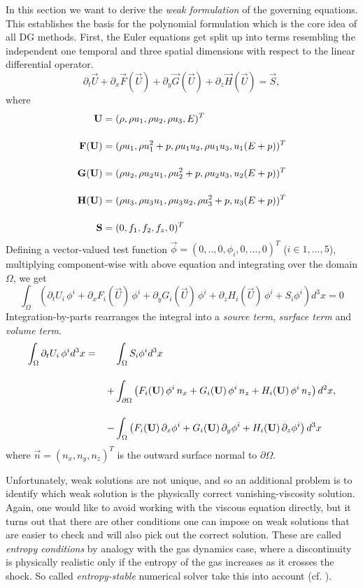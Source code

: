 In this section we want to derive the \emph{weak formulation} of the governing
equations. This establishes the basis for the polynomial formulation which is
the core idea of all DG methods.  First, the Euler equations get split up into
terms resembling the independent one temporal and three spatial
dimensions with respect to the linear differential operator.
\begin{equation}
\partial_t \vec{U} + \partial_x\vec{F}(\vec{U})+ \partial_y\vec{G}(\vec{U}) + \partial_z\vec{H}(\vec{U}) = \vec{S},
\end{equation}
where
\begin{align}
    \vec{U} &= (\dens, \dens\vels_1, \dens\vels_2, \dens\vels_3, \Ener)^T\br
    \vec{F}(\vec{U}) &= (\dens\vels_1, \dens\vels_1^2 + \pres, \dens\vels_1\vels_2, \dens\vels_1\vels_3, \vels_1(\Ener + \pres))^T\br
    \vec{G}(\vec{U}) &= (\dens\vels_2, \dens\vels_2\vels_1, \dens\vels_2^2 + \pres, \dens\vels_2\vels_3, \vels_2(\Ener + \pres))^T\br
    \vec{H}(\vec{U}) &= (\dens\vels_3, \dens\vels_3\vels_1, \dens\vels_3\vels_2, \dens\vels_3^2 + \pres, \vels_3(\Ener + \pres))^T\br
    \vec{S} &= (0,f_1,f_2,f_z,0)^T
\end{align}
Defining a vector-valued test function $\vec{\phi} = (0,..,0,\phi_i,0,...,0)^T$
($i\in{1,...,5}$), multiplying component-wise with above equation and
integrating over the domain $\Omega$, we get
\begin{equation}
    \int_\Omega \left( \partial_tU_i\,\phi^i 
        + \partial_x F_i(\vec{U})\,\phi^i 
        + \partial_y G_i(\vec{U})\,\phi^i 
        + \partial_z H_i(\vec{U})\,\phi^i + S_i \phi^i \right) d^3x = 0
\end{equation}
Integration-by-parts rearranges the integral into a \emph{source term},
\emph{surface term} and \emph{volume term}.
\begin{align}
\label{eqn:weak-formulation}
    \int_\Omega \partial_t U_i\,\phi^i d^3x = \;\;\;\;\;\;\;&\int_\Omega S_i \phi^i d^3x \br
    +& \int_{\partial\Omega} \left(F_i(\vec{U})\,\phi^i\,n_x + G_i(\vec{U})\,\phi^i\,n_z + H_i(\vec{U})\,\phi^i\,n_z \right) d^2x,\nonumber \br
    -& \int_\Omega \left(F_i(\vec{U})\,\partial_x \phi^i + G_i(\vec{U})\,\partial_y \phi^i + H_i(\vec{U})\,\partial_z \phi^i \right) d^3x
\end{align}
where $\vec{n} = (n_x,n_y,n_z)^T$ is the outward surface normal to $\partial\Omega$.

Unfortunately, weak solutions are not unique, and so an additional problem is
to identify which weak solution is the physically correct vanishing-viscosity
solution. Again, one would like to avoid working with the viscous equation
directly, but it turns out that there are other conditions one can impose on
weak solutions that are easier to check and will also pick out the correct
solution. These are called \emph{entropy conditions} by analogy with the gas
dynamics case, where a discontinuity is physically realistic only if the
entropy of the gas increases as it crosses the shock. So called \emph{entropy-stable}
numerical solver take this into account (cf. \cite{derigs2016novel}).
